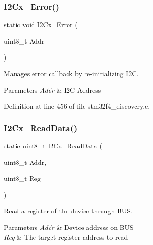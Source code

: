 \subsubsection{\texorpdfstring{I2\+Cx\+\_\+\+Error()}{I2Cx\_Error()}}
{\footnotesize\ttfamily static void I2\+Cx\+\_\+\+Error (\begin{DoxyParamCaption}\item[{uint8\+\_\+t}]{Addr }\end{DoxyParamCaption})\hspace{0.3cm}{\ttfamily [static]}}



Manages error callback by re-\/initializing I2C. 


\begin{DoxyParams}{Parameters}
{\em Addr} & I2C Address \\
\hline
\end{DoxyParams}


Definition at line 456 of file stm32f4\+\_\+discovery.\+c.

\mbox{\label{group___s_t_m32_f4___d_i_s_c_o_v_e_r_y___l_o_w___l_e_v_e_l___b_u_s___functions_ga83262e4774a2b013627824b62327f03e}} 
\subsubsection{\texorpdfstring{I2\+Cx\+\_\+\+Read\+Data()}{I2Cx\_ReadData()}}
{\footnotesize\ttfamily static uint8\+\_\+t I2\+Cx\+\_\+\+Read\+Data (\begin{DoxyParamCaption}\item[{uint8\+\_\+t}]{Addr,  }\item[{uint8\+\_\+t}]{Reg }\end{DoxyParamCaption})\hspace{0.3cm}{\ttfamily [static]}}



Read a register of the device through B\+US. 


\begin{DoxyParams}{Parameters}
{\em Addr} & Device address on B\+US ~\newline
\\
\hline
{\em Reg} & The target register address to read \\
\hline
\end{DoxyParams}

